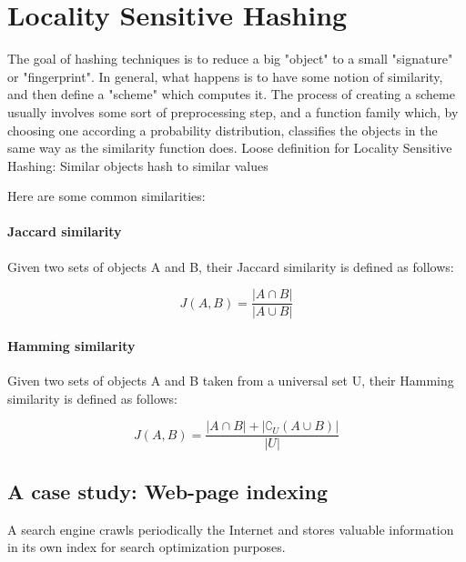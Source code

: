 \documentclass{report}
\begin{document}
\chapter{Locality Sensitive Hashing}
	
	\par
	The goal of hashing techniques is to reduce a big "object" to a small "signature" or "fingerprint".	In general, what happens is to have some notion of similarity, and then define a "scheme" which computes it. The process of creating a scheme usually involves some sort of preprocessing step, and a function family which, by choosing one according a probability distribution, classifies the objects in the same way as the similarity function does.
	Loose definition for Locality Sensitive Hashing: Similar objects hash to similar values
	
	\par
	Here are some common similarities:
	
\subsubsection{Jaccard similarity}
	
	Given two sets of objects A and B, their Jaccard similarity is defined as follows:
	
	\begin{equation}
	\displaystyle J(A, B) = \frac{|A\cap B|}{|A\cup B|}
	\end{equation}
	
\subsubsection{Hamming similarity}
	
	Given two sets of objects A and B taken from a universal set U, their Hamming similarity is defined as follows:
	
	\begin{equation}
	\displaystyle J(A, B) = \frac{|A\cap B| + |\complement_U(A\cup B)|}{|U|}
	\end{equation}
	
\section{A case study: Web-page indexing}
	
	A search engine crawls periodically the Internet and stores valuable information in its own index for search optimization purposes.
	
\end{document}

